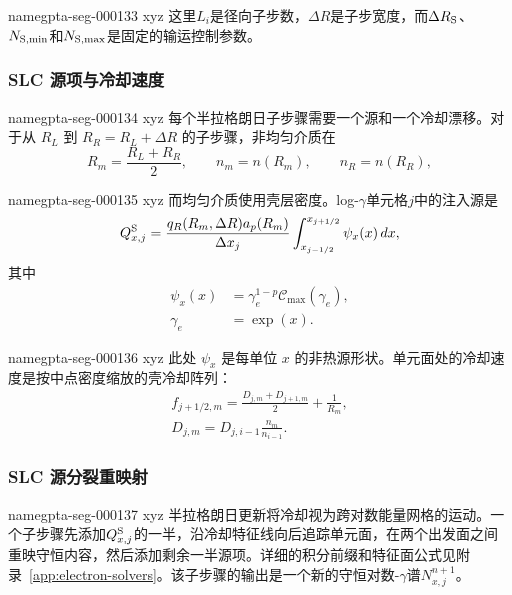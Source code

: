 \documentclass[twocolumn]{aastex702}
\makeatletter
\providecommand{\gptareaderanchor}[1]{\pdfdest name{#1} xyz}%
\providecommand{\gptareaderanchor}[1]{\special{pdf:dest (#1) [ @thispage /XYZ @xpos @ypos null ]}}%
\makeatother
\begin{document}
\gptareaderanchor{gpta-seg-000133}%
这里\(L_i\)是径向子步数，\(\Delta R\)是子步宽度，而\(\Delta R_{\rm S}\)、\(N_{\rm S,min}\)和\(N_{\rm S,max}\)是固定的输运控制参数。

\subsubsection{SLC 源项与冷却速度}


\gptareaderanchor{gpta-seg-000134}%
每个半拉格朗日子步骤需要一个源和一个冷却漂移。对于从 \(R_L\) 到 \(R_R=R_L+\Delta R\) 的子步骤，非均匀介质在
\begin{equation}
R_m=\frac{R_L+R_R}{2},\qquad n_m=n(R_m),\qquad n_R=n(R_R),
\end{equation}

\gptareaderanchor{gpta-seg-000135}%
而均匀介质使用壳层密度。log-\(\gamma\)单元格\(j\)中的注入源是
\begin{equation}
Q_{x,j}^{\rm S}=
\frac{q_R(R_m,\Delta R)a_p(R_m)}{\Delta x_j}
\int_{x_{j-1/2}}^{x_{j+1/2}}
\psi_x(x)\,dx ,
\end{equation}
其中
\begin{equation}
\begin{aligned}
\psi_x(x)&=\gamma_e^{1-p}\mathcal C_{\max}(\gamma_e),\\
\gamma_e&=\exp(x) .
\end{aligned}
\end{equation}

\gptareaderanchor{gpta-seg-000136}%
此处 \(\psi_x\) 是每单位 \(x\) 的非热源形状。单元面处的冷却速度是按中点密度缩放的壳冷却阵列：
\begin{equation}
\begin{aligned}
f_{j+1/2,m}=
\frac{D_{j,m}+D_{j+1,m}}{2}+\frac{1}{R_m},\\
D_{j,m}=D_{j,i-1}\frac{n_m}{n_{i-1}} .
\end{aligned}
\end{equation}

\subsubsection{SLC 源分裂重映射}


\gptareaderanchor{gpta-seg-000137}%
半拉格朗日更新将冷却视为跨对数能量网格的运动。一个子步骤先添加\(Q_{x,j}^{\rm S}\)的一半，沿冷却特征线向后追踪单元面，在两个出发面之间重映守恒内容，然后添加剩余一半源项。详细的积分前缀和特征面公式见附录~\ref{app:electron-solvers}。该子步骤的输出是一个新的守恒对数-\(\gamma\)谱\(N_{x,j}^{n+1}\)。
\end{document}
